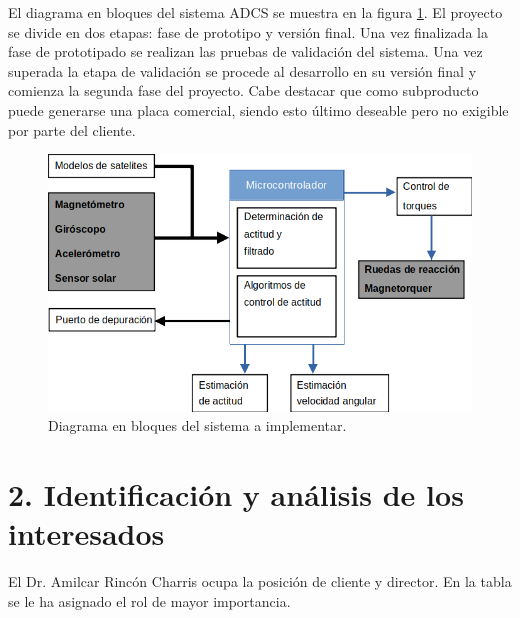 \documentclass[
11pt, %
]{charter}
\begin{document}
El diagrama en bloques del sistema ADCS se muestra en la figura \ref{fig:adcs}. El proyecto se divide en dos etapas: fase de prototipo y versión final. Una vez finalizada la fase de prototipado se realizan las pruebas de validación del sistema.  Una vez superada la etapa de validación se procede al desarrollo en su versión final y comienza la segunda fase del proyecto. 
Cabe destacar que como subproducto puede generarse una placa comercial, siendo esto último deseable pero no exigible por parte del cliente. 

\begin{figure}[htpb]
	\centering 
	\includegraphics[width=.8\textwidth]{Figuras/sistemaadcs.png}
	\caption{Diagrama en bloques del sistema a implementar.}
	\label{fig:adcs}
\end{figure}

\section{2. Identificación y análisis de los interesados}
\label{sec:interesados}
	El Dr. Amilcar Rincón Charris ocupa la posición de cliente y director. En la tabla se le ha asignado el rol de mayor importancia.
\end{document}
